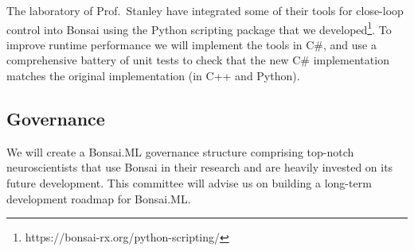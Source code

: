 The laboratory of Prof.~Stanley have integrated some of their tools for
close-loop control into Bonsai using the Python scripting package that we
developed\footnote{https://bonsai-rx.org/python-scripting/}.
%
To improve runtime performance we will implement the tools in C\#, and use a
comprehensive battery of unit tests to check that the new C\# implementation
matches the original implementation (in C++ and Python).

\subsection*{Governance}

We will create a Bonsai.ML governance structure comprising top-notch
neuroscientists that use Bonsai in their research and are heavily invested on
its future development.
%
This committee will advise us on building a long-term development roadmap for
Bonsai.ML.
